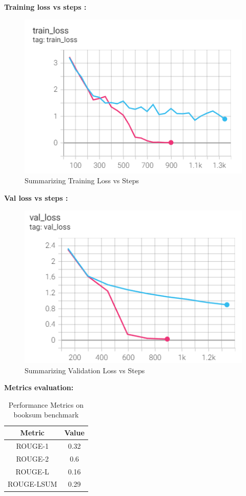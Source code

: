 \newpage

\hfill \break
\textbf{Training loss vs steps :}

\begin{figure}[h!]
	\centering
	\includegraphics[scale=0.8]{figures/Summarization Training Loss vs Steps.png.png}
	\caption{ Summarizing Training Loss vs Steps }
\end{figure}

\hfill \break
\textbf{Val loss vs steps :}

\begin{figure}[h!]
	\centering
	\includegraphics[scale=0.8]{figures/Summarization Val Loss vs Steps.png.png}
	\caption{ Summarizing Validation Loss vs Steps }
\end{figure}

\newpage
\hfill \break
\textbf{Metrics evaluation:} 

\begin{table}[h!]
    \centering
    \begin{tabular}{|c|c|}
        \hline
        \textbf{Metric} & \textbf{Value} \\
        \hline
        ROUGE-1 & 0.32\\
        \hline
        ROUGE-2 & 0.6 \\
        \hline
        ROUGE-L & 0.16 \\
        \hline
        ROUGE-LSUM & 0.29 \\
        \hline
    \end{tabular}
    \caption{Performance Metrics on booksum benchmark}
    \label{tab:performance_metrics}
\end{table}

